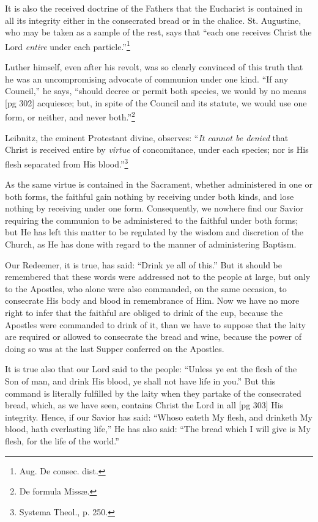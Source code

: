 It is also the received doctrine of the Fathers
that the Eucharist is contained in all its integrity
either in the consecrated bread or in the chalice.
St. Augustine, who may be taken as a sample of
the rest, says that “each one receives Christ the
Lord \emph{entire} under each particle.”\footnote{Aug.
De consec. dist.}

Luther himself, even after his revolt, was so
clearly convinced of this truth that he was an uncompromising
advocate of communion under one
kind. “If any Council,” he says, “should decree
or permit both species, we would by no means
[pg 302]
acquiesce; but, in spite of the Council and its statute,
we would use one form, or neither, and never
both.”\footnote{De formula Missæ.}

Leibnitz, the eminent Protestant divine, observes:
“\emph{It cannot be denied} that Christ is received
entire by \emph{virtue} of concomitance, under each
species; nor is His flesh separated from His
blood.”\footnote{Systema Theol., p. 250.}

As the same virtue is contained in the Sacrament,
whether administered in one or both forms,
the faithful gain nothing by receiving under both
kinds, and lose nothing by receiving under one
form. Consequently, we nowhere find our Savior
requiring the communion to be administered to the
faithful under both forms; but He has left this
matter to be regulated by the wisdom and discretion
of the Church, as He has done with regard to
the manner of administering Baptism.

Our Redeemer, it is true, has said: “Drink ye
all of this.” But it should be remembered that
these words were addressed not to the people at
large, but only to the Apostles, who alone were
also commanded, on the same occasion, to consecrate
His body and blood in remembrance of Him.
Now we have no more right to infer that the faithful
are obliged to drink of the cup, because the
Apostles were commanded to drink of it, than we
have to suppose that the laity are required or allowed
to consecrate the bread and wine, because
the power of doing so was at the last Supper conferred
on the Apostles.

It is true also that our Lord said to the people:
“Unless ye eat the flesh of the Son of man, and
drink His blood, ye shall not have life in you.”
But this command is literally fulfilled by the laity
when they partake of the consecrated bread, which,
as we have seen, contains Christ the Lord in all
[pg 303]
His integrity. Hence, if our Savior has said:
“Whoso eateth My flesh, and drinketh My blood,
hath everlasting life,” He has also said: “The
bread which I will give is My flesh, for the life of
the world.”

